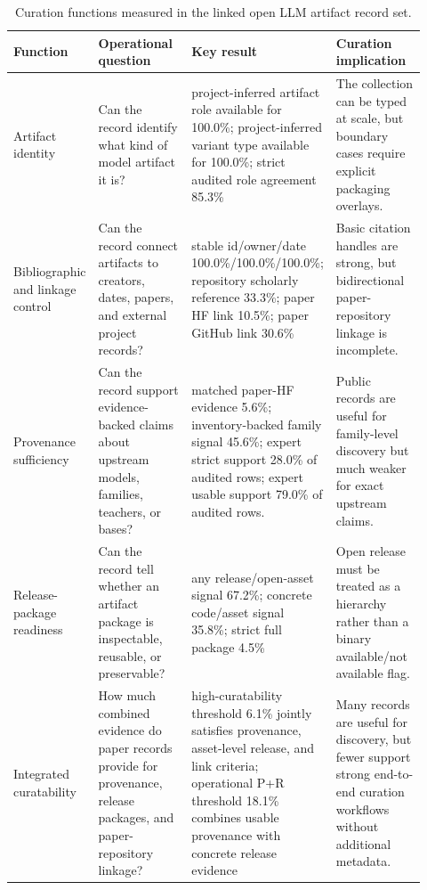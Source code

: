 \begin{table}[!tbp]
\centering
\caption{Curation functions measured in the linked open LLM artifact record set.}
\label{tab:curation-functions}
\small
\begin{tabular}{p{0.16\linewidth}p{0.25\linewidth}p{0.27\linewidth}p{0.24\linewidth}}
\toprule
Function & Operational question & Key result & Curation implication \\
\midrule
Artifact identity & Can the record identify what kind of model artifact it is? & project-inferred artifact role available for 100.0\%; project-inferred variant type available for 100.0\%; strict audited role agreement 85.3\% & The collection can be typed at scale, but boundary cases require explicit packaging overlays. \\
Bibliographic and linkage control & Can the record connect artifacts to creators, dates, papers, and external project records? & stable id/owner/date 100.0\%/100.0\%/100.0\%; repository scholarly reference 33.3\%; paper HF link 10.5\%; paper GitHub link 30.6\% & Basic citation handles are strong, but bidirectional paper-repository linkage is incomplete. \\
Provenance sufficiency & Can the record support evidence-backed claims about upstream models, families, teachers, or bases? & matched paper-HF evidence 5.6\%; inventory-backed family signal 45.6\%; expert strict support 28.0\% of audited rows; expert usable support 79.0\% of audited rows. & Public records are useful for family-level discovery but much weaker for exact upstream claims. \\
Release-package readiness & Can the record tell whether an artifact package is inspectable, reusable, or preservable? & any release/open-asset signal 67.2\%; concrete code/asset signal 35.8\%; strict full package 4.5\% & Open release must be treated as a hierarchy rather than a binary available/not available flag. \\
Integrated curatability & How much combined evidence do paper records provide for provenance, release packages, and paper-repository linkage? & high-curatability threshold 6.1\% jointly satisfies provenance, asset-level release, and link criteria; operational P+R threshold 18.1\% combines usable provenance with concrete release evidence & Many records are useful for discovery, but fewer support strong end-to-end curation workflows without additional metadata. \\
\bottomrule
\end{tabular}
\end{table}
